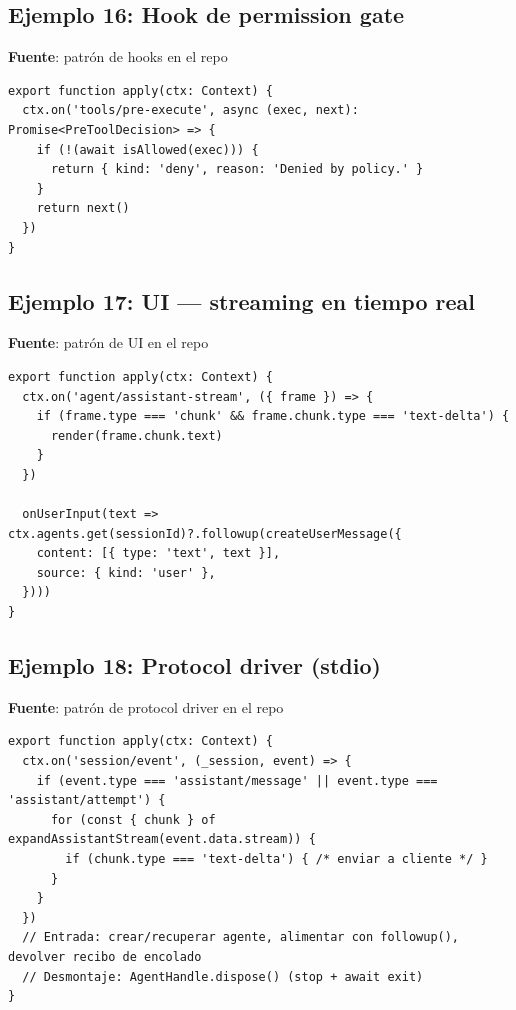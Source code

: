 \documentclass[11pt,a4paper]{article}
\begin{document}
\subsection*{Ejemplo 16: Hook de permission gate}


\textbf{Fuente}: patrón de hooks en el repo


\begin{lstlisting}
export function apply(ctx: Context) {
  ctx.on('tools/pre-execute', async (exec, next): Promise<PreToolDecision> => {
    if (!(await isAllowed(exec))) {
      return { kind: 'deny', reason: 'Denied by policy.' }
    }
    return next()
  })
}
\end{lstlisting}


\subsection*{Ejemplo 17: UI — streaming en tiempo real}


\textbf{Fuente}: patrón de UI en el repo


\begin{lstlisting}
export function apply(ctx: Context) {
  ctx.on('agent/assistant-stream', ({ frame }) => {
    if (frame.type === 'chunk' && frame.chunk.type === 'text-delta') {
      render(frame.chunk.text)
    }
  })

  onUserInput(text => ctx.agents.get(sessionId)?.followup(createUserMessage({
    content: [{ type: 'text', text }],
    source: { kind: 'user' },
  })))
}
\end{lstlisting}


\subsection*{Ejemplo 18: Protocol driver (stdio)}


\textbf{Fuente}: patrón de protocol driver en el repo


\begin{lstlisting}
export function apply(ctx: Context) {
  ctx.on('session/event', (_session, event) => {
    if (event.type === 'assistant/message' || event.type === 'assistant/attempt') {
      for (const { chunk } of expandAssistantStream(event.data.stream)) {
        if (chunk.type === 'text-delta') { /* enviar a cliente */ }
      }
    }
  })
  // Entrada: crear/recuperar agente, alimentar con followup(), devolver recibo de encolado
  // Desmontaje: AgentHandle.dispose() (stop + await exit)
}
\end{lstlisting}
\end{document}
